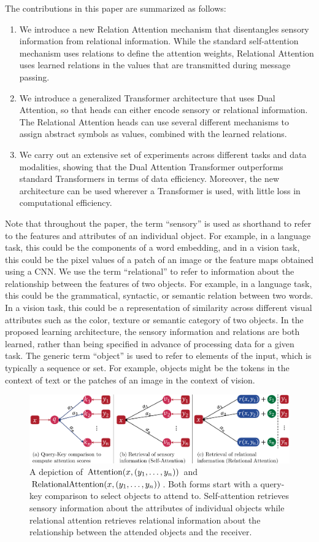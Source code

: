 The contributions in this paper are summarized as follows:
\begin{enumerate}
  \item We introduce a new Relation Attention mechanism that disentangles sensory information from relational information. While the standard self-attention mechanism uses relations to define the attention weights, Relational Attention uses learned relations in the values that are transmitted during message passing. 
  \item We introduce a generalized Transformer architecture that uses Dual Attention, so that heads can either encode sensory or relational information. The Relational Attention heads can use several different mechanisms to assign abstract symbols as values, combined with the learned relations. 
  \item We carry out an extensive set of experiments across different tasks and data modalities, showing that the Dual Attention Transformer outperforms standard Transformers in terms of data efficiency. Moreover, the new architecture can be used wherever a Transformer is used, with little loss in computational efficiency.
\end{enumerate}

Note that throughout the paper, the term ``sensory'' is used as shorthand to refer to the features and attributes of an individual object. For example, in a language task, this could be the components of a word embedding, and in a vision task, this could be 
the pixel values of a patch of an image or the feature maps obtained using a CNN. We use the term ``relational'' to refer to information about the relationship between the features of two objects. For example, in a language task, this could be the grammatical, syntactic, or semantic relation between two words. In a vision task, this could be a representation of similarity across different visual attributes such as the color, texture 
or semantic category of two objects. In the proposed learning architecture, 
the sensory information and relations are both learned, rather than being specified in advance of processing data for a given task.  The generic term ``object'' 
is used to refer to elements of the input, which is typically a sequence or set. 
For example, objects might be the tokens in the context of text or the patches of an image in the context of vision.

\begin{figure}[t]
  \includegraphics[width=\textwidth]{figs/attn_fig_combined.pdf}
  \caption{A depiction of $\mathrm{Attention}(x, (y_1, \ldots, y_n))$ and $\mathrm{RelationalAttention}(x, (y_1, \ldots, y_n))$. Both forms start with a query-key comparison to select objects to attend to. Self-attention retrieves sensory information about the attributes of individual objects while relational attention retrieves relational information about the relationship between the attended objects and the receiver.}\label{fig:selfattn_relattn}
\end{figure}
